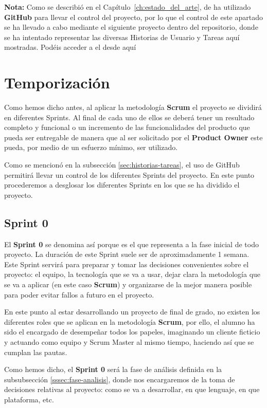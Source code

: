 \textbf{Nota:} Como se describió en el Capítulo~\ref{ch:estado_del_arte}, de ha utilizado \textbf{GitHub} para llevar el control del proyecto, por lo que el control de este apartado se ha llevado a cabo mediante el siguiente proyecto dentro del repositorio, donde se ha intentado representar las diversas Historias de Usuario y Tareas aquí mostradas. Podéis acceder a el desde aquí \cite{proyecto-github}

\section{Temporización}

Como hemos dicho antes, al aplicar la metodología \textbf{Scrum} el proyecto se dividirá en diferentes Sprints. Al final de cada uno de ellos se deberá tener un resultado completo y funcional o un incremento de las funcionalidades del producto que pueda ser entregable de manera que al ser solicitado por el \textbf{Product Owner} este pueda, por medio de un esfuerzo mínimo, ser utilizado.

Como se mencionó en la subsección \ref{sec:historias-tareas}, el uso de GitHub permitirá llevar un control de los diferentes Sprints del proyecto. En este punto procederemos a desglosar los diferentes Sprints en los que se ha dividido el proyecto.

\subsection{Sprint 0}

El \textbf{Sprint 0} se denomina así porque es el que representa a la fase inicial de todo proyecto. La duración de este Sprint suele ser de aproximadamente 1 semana. Este Sprint servirá para preparar y tomar las decisiones convenientes sobre el proyecto: el equipo, la tecnología que se va a usar, dejar clara la metodología que se va a aplicar (en este caso \textbf{Scrum}) y organizarse de la mejor manera posible para poder evitar fallos a futuro en el proyecto.

En este punto al estar desarrollando un proyecto de final de grado, no existen los diferentes roles que se aplican en la metodología \textbf{Scrum}, por ello, el alumno ha sido el encargado de desempeñar todos los papeles, imaginando un cliente ficticio y actuando como equipo y Scrum Master al mismo tiempo, haciendo así que se cumplan las pautas.

Como hemos dicho, el \textbf{Sprint 0} será la fase de análisis definida en la subsubsección \ref{sssec:fase-analisis}, donde nos encargaremos de la toma de decisiones relativas al proyecto: como se va a desarrollar, en que lenguaje, en que plataforma, etc.

